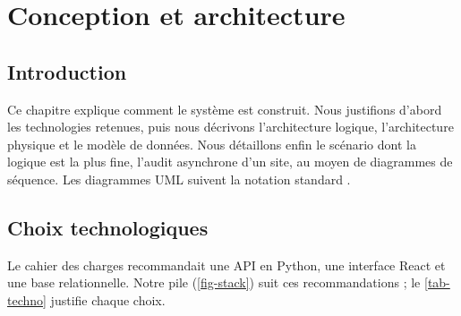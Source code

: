 \chapter{Conception et architecture}

\section{Introduction}
Ce chapitre explique comment le système est construit. Nous justifions d'abord les technologies retenues, puis nous décrivons l'architecture logique, l'architecture physique et le modèle de données. Nous détaillons enfin le scénario dont la logique est la plus fine, l'audit asynchrone d'un site, au moyen de diagrammes de séquence. Les diagrammes UML suivent la notation standard \cite{omguml}.

\section{Choix technologiques}
Le cahier des charges recommandait une API en Python, une interface React et une base relationnelle. Notre pile (\cref{fig-stack}) suit ces recommandations ; le \cref{tab-techno} justifie chaque choix.


